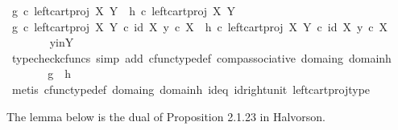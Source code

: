 \begin{isabellebody}
\ {\isachardoublequoteopen}g\ {\isasymcirc}\isactrlsub c\ left{\isacharunderscore}{\kern0pt}cart{\isacharunderscore}{\kern0pt}proj\ X\ Y\ {\isacharequal}{\kern0pt}\ h\ {\isasymcirc}\isactrlsub c\ left{\isacharunderscore}{\kern0pt}cart{\isacharunderscore}{\kern0pt}proj\ X\ Y{\isachardoublequoteclose}\isanewline
\ \ \ \ \isamarkupfalse%
\ \isamarkupfalse%
\ {\isachardoublequoteopen}g\ {\isasymcirc}\isactrlsub c\ left{\isacharunderscore}{\kern0pt}cart{\isacharunderscore}{\kern0pt}proj\ X\ Y\ {\isasymcirc}\isactrlsub c\ {\isasymlangle}id\ X{\isacharcomma}{\kern0pt}\ y\ {\isasymcirc}\isactrlsub c\ {\isasymbeta}\isactrlbsub X\isactrlesub {\isasymrangle}\ {\isacharequal}{\kern0pt}\ h\ {\isasymcirc}\isactrlsub c\ left{\isacharunderscore}{\kern0pt}cart{\isacharunderscore}{\kern0pt}proj\ X\ Y\ {\isasymcirc}\isactrlsub c\ {\isasymlangle}id\ X{\isacharcomma}{\kern0pt}\ y\ {\isasymcirc}\isactrlsub c\ {\isasymbeta}\isactrlbsub X\isactrlesub {\isasymrangle}{\isachardoublequoteclose}\isanewline
\ \ \ \ \ \ \isamarkupfalse%
\ y{\isacharunderscore}{\kern0pt}in{\isacharunderscore}{\kern0pt}Y\ \isamarkupfalse%
\ {\isacharparenleft}{\kern0pt}typecheck{\isacharunderscore}{\kern0pt}cfuncs{\isacharcomma}{\kern0pt}\ simp\ add{\isacharcolon}{\kern0pt}\ cfunc{\isacharunderscore}{\kern0pt}type{\isacharunderscore}{\kern0pt}def\ comp{\isacharunderscore}{\kern0pt}associative\ domain{\isacharunderscore}{\kern0pt}g\ domain{\isacharunderscore}{\kern0pt}h{\isacharparenright}{\kern0pt}\isanewline
\ \ \ \ \isamarkupfalse%
\ \isamarkupfalse%
\ {\isachardoublequoteopen}g\ {\isacharequal}{\kern0pt}\ h{\isachardoublequoteclose}\isanewline
\ \ \ \ \ \ \isamarkupfalse%
\ {\isacharparenleft}{\kern0pt}metis\ cfunc{\isacharunderscore}{\kern0pt}type{\isacharunderscore}{\kern0pt}def\ domain{\isacharunderscore}{\kern0pt}g\ domain{\isacharunderscore}{\kern0pt}h\ id{\isacharunderscore}{\kern0pt}eq\ id{\isacharunderscore}{\kern0pt}right{\isacharunderscore}{\kern0pt}unit\ left{\isacharunderscore}{\kern0pt}cart{\isacharunderscore}{\kern0pt}proj{\isacharunderscore}{\kern0pt}type{\isacharparenright}{\kern0pt}\isanewline
\ \ \isamarkupfalse%
\isanewline
{}\isamarkupfalse%
%
\endisatagproof
{\isafoldproof}%
%
\isadelimproof
%
\endisadelimproof
%
\begin{isamarkuptext}%
The lemma below is the dual of Proposition 2.1.23 in Halvorson.%
\end{isamarkuptext}\isamarkuptrue%
\isamarkupfalse%

\end{isabellebody}

